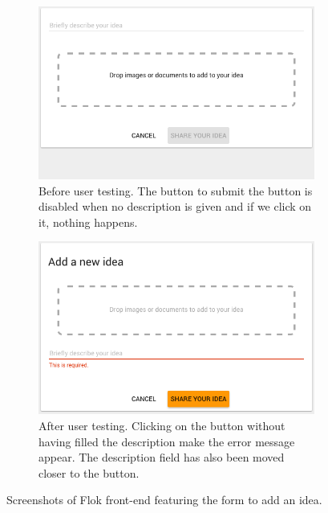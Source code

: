 \documentclass[a4paper,12pt,twoside]{article}
\begin{document}
\begin{figure}[!htb]
    \begin{subfigure}[t]{.495\textwidth}
        \includegraphics[width=\textwidth]{images/user_tests/addIdeaForm_before.png}
        \caption{Before user testing. The button to submit the button is disabled when no description is given and if we click on it, nothing happens.}
        \label{fig.tests.addIdeaForm.before}
    \end{subfigure}
    \hfill
    \begin{subfigure}[t]{.495\textwidth}
        \includegraphics[width=\textwidth]{images/user_tests/addIdeaForm_after.png}
        \caption{After user testing. Clicking on the button without having filled the description make the error message appear. The description field has also been moved closer to the button.}
        \label{fig.tests.addIdeaForm.after}
    \end{subfigure}
    \caption{Screenshots of Flok front-end featuring the form to add an idea.}
    \label{fig.tests.addIdeaForm}
\end{figure}
\end{document}
